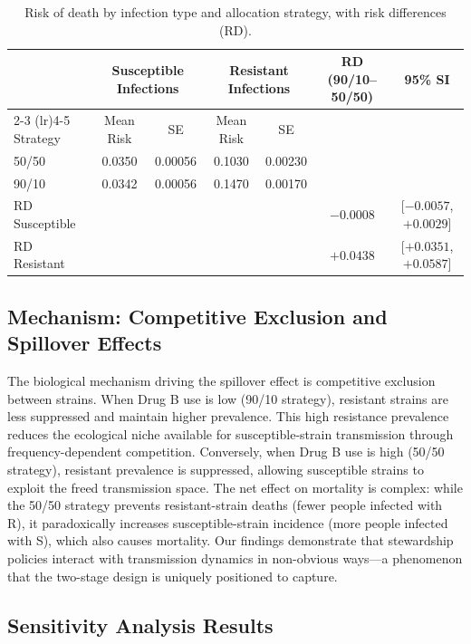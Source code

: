 \documentclass[preprint,11pt]{elsarticle}
\begin{document}
\begin{table}[ht]
\centering
\caption{Risk of death by infection type and allocation strategy, with risk differences (RD).}
\label{tab:risk_summary}
\begin{tabular}{lcccccc}
\toprule
& \multicolumn{2}{c}{Susceptible Infections} & \multicolumn{2}{c}{Resistant Infections} &
\multirow{2}{*}{RD (90/10--50/50)} & \multirow{2}{*}{95\% SI} \\
\cmidrule(lr){2-3} \cmidrule(lr){4-5}
Strategy & Mean Risk & SE & Mean Risk & SE &  &  \\
\midrule
50/50 & 0.0350 & 0.00056 & 0.1030 & 0.00230 &  &  \\
90/10 & 0.0342 & 0.00056 & 0.1470 & 0.00170 &  &  \\
\midrule
RD Susceptible &  &  &  &  & $-0.0008$ & [$-0.0057$, $+0.0029$] \\
RD Resistant &  &  &  &  & $+0.0438$ & [$+0.0351$, $+0.0587$] \\
\bottomrule
\end{tabular}
\end{table}


\subsection{Mechanism: Competitive Exclusion and Spillover Effects}

The biological mechanism driving the spillover effect is competitive exclusion between strains. When Drug B use is low (90/10 strategy), resistant strains are less suppressed and maintain higher prevalence. This high resistance prevalence reduces the ecological niche available for susceptible-strain transmission through frequency-dependent competition. Conversely, when Drug B use is high (50/50 strategy), resistant prevalence is suppressed, allowing susceptible strains to exploit the freed transmission space. The net effect on mortality is complex: while the 50/50 strategy prevents resistant-strain deaths (fewer people infected with R), it paradoxically increases susceptible-strain incidence (more people infected with S), which also causes mortality. Our findings demonstrate that stewardship policies interact with transmission dynamics in non-obvious ways---a phenomenon that the two-stage design is uniquely positioned to capture.

\subsection{Sensitivity Analysis Results}
\end{document}
